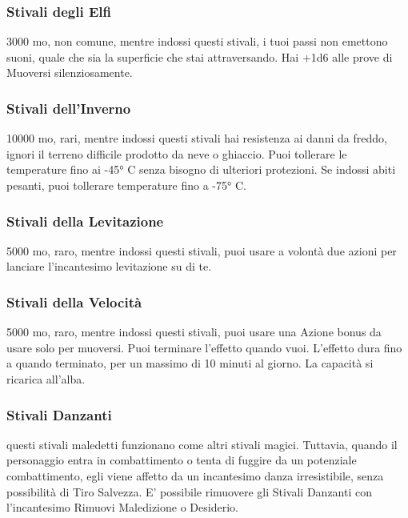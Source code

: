 \begin{multicols}{2}
\subsubsection*{Stivali degli Elfi}
3000 mo, non comune, mentre indossi questi stivali, i tuoi passi non emettono suoni, quale che sia la superficie che stai attraversando. Hai +1d6 alle prove di Muoversi silenziosamente.

\subsubsection*{Stivali dell'Inverno}
10000 mo, rari, mentre indossi questi stivali hai resistenza ai danni da freddo, ignori il terreno difficile prodotto da neve o ghiaccio. Puoi tollerare le temperature fino ai -45° C senza bisogno di ulteriori protezioni. Se indossi abiti pesanti, puoi tollerare temperature fino a -75° C.

\subsubsection*{Stivali della Levitazione}
5000 mo, raro, mentre indossi questi stivali, puoi usare a volontà due azioni per lanciare l'incantesimo levitazione su di te.

\subsubsection*{Stivali della Velocità}
5000 mo, raro, mentre indossi questi stivali, puoi usare una Azione bonus da usare solo per muoversi. Puoi terminare l'effetto quando vuoi. L'effetto dura fino a quando terminato, per un massimo di 10 minuti al giorno. La capacità si ricarica all'alba.

\subsubsection*{Stivali Danzanti}
questi stivali maledetti funzionano come altri stivali magici. Tuttavia, quando il personaggio entra in combattimento o tenta di fuggire da un potenziale combattimento, egli viene affetto da un incantesimo danza irresistibile, senza possibilità di Tiro Salvezza. E' possibile rimuovere gli Stivali Danzanti con l'incantesimo Rimuovi Maledizione o Desiderio.


\end{multicols}
